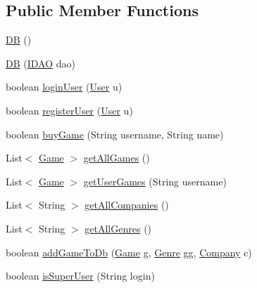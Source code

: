 \subsection*{Public Member Functions}
\begin{DoxyCompactItemize}
\item 
\hyperlink{classes_1_1deusto_1_1server_1_1db_1_1_d_b_ab53f32f36928ba9aa3ddff65fce395dc}{DB} ()
\item 
\hyperlink{classes_1_1deusto_1_1server_1_1db_1_1_d_b_a95f85fb4da6cf8b630f12536c81caaff}{DB} (\hyperlink{interfacees_1_1deusto_1_1server_1_1db_1_1dao_1_1_i_d_a_o}{I\+D\+AO} dao)
\item 
boolean \hyperlink{classes_1_1deusto_1_1server_1_1db_1_1_d_b_a8e5744311b5924e740d190673abee104}{login\+User} (\hyperlink{classes_1_1deusto_1_1server_1_1db_1_1data_1_1_user}{User} u)
\item 
boolean \hyperlink{classes_1_1deusto_1_1server_1_1db_1_1_d_b_a888f468b3fc2a05520fca9ac135823e3}{register\+User} (\hyperlink{classes_1_1deusto_1_1server_1_1db_1_1data_1_1_user}{User} u)
\item 
boolean \hyperlink{classes_1_1deusto_1_1server_1_1db_1_1_d_b_a8aa2e7531181a31b54850ca6665f87c2}{buy\+Game} (String username, String name)
\item 
List$<$ \hyperlink{classes_1_1deusto_1_1server_1_1db_1_1data_1_1_game}{Game} $>$ \hyperlink{classes_1_1deusto_1_1server_1_1db_1_1_d_b_ad878c1c58062596b5e1b582ed496bd11}{get\+All\+Games} ()
\item 
List$<$ \hyperlink{classes_1_1deusto_1_1server_1_1db_1_1data_1_1_game}{Game} $>$ \hyperlink{classes_1_1deusto_1_1server_1_1db_1_1_d_b_a1c471589284782e7ff1190f2b6c2369e}{get\+User\+Games} (String username)
\item 
List$<$ String $>$ \hyperlink{classes_1_1deusto_1_1server_1_1db_1_1_d_b_a59802aeefdd9d445152fbd548a964708}{get\+All\+Companies} ()
\item 
List$<$ String $>$ \hyperlink{classes_1_1deusto_1_1server_1_1db_1_1_d_b_a741c4c8b38c31010d5c86e1586ffa880}{get\+All\+Genres} ()
\item 
boolean \hyperlink{classes_1_1deusto_1_1server_1_1db_1_1_d_b_a376112d91f8e3018821fd9362f6598ae}{add\+Game\+To\+Db} (\hyperlink{classes_1_1deusto_1_1server_1_1db_1_1data_1_1_game}{Game} g, \hyperlink{classes_1_1deusto_1_1server_1_1db_1_1data_1_1_genre}{Genre} gg, \hyperlink{classes_1_1deusto_1_1server_1_1db_1_1data_1_1_company}{Company} c)
\item 
boolean \hyperlink{classes_1_1deusto_1_1server_1_1db_1_1_d_b_a53a59425c7690f07861fd5d006f83cbc}{is\+Super\+User} (String login)

\end{DoxyCompactItemize}
